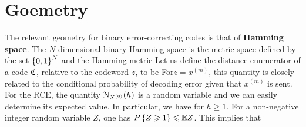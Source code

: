 \documentclass[letterpaper,english,10pt]{article}
\begin{document}
\section{Goemetry}

The relevant geometry for binary error-correcting codes is that of \textbf{Hamming space}. 
The $N$-dimensional binary Hamming space is the metric space defined by the set  $\left\{0,1\right\}^N$ and the Hamming metric
Let us define the distance enumerator of a code $\mathfrak{C}$, relative to the codeword $z$, to be
For$ z = x^{(m)}$, this quantity is closely related to the conditional probability of decoding error given that $x^{(m)}$ is sent.
For the RCE, the quantity $\mathcal{N}_{X^{(0)}}(h)$ is a random variable and we can easily determine its expected value. 
In particular, we have 
for $h  \ge 1$. 
For a non-negative integer random variable $Z$, one has $P\left\{Z \geqslant 1\right\} \leqslant \mathbb{E} Z$. 
This implies that
\end{document}
